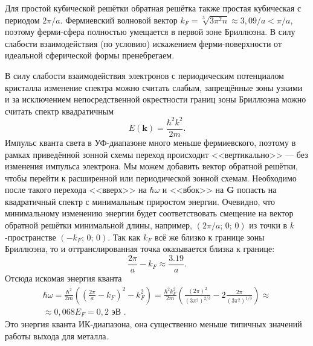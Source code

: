 \documentclass[a4paper]{article}
\begin{document}
\begin{sol}
Для простой кубической решётки обратная решётка
также простая кубическая с периодом $2\pi /a$.
Фермиевский волновой вектор $k_F = \sqrt[3]{3\pi^2 n} \approx 3,09 /a< \pi /a$, поэтому ферми-сфера
полностью умещается в первой зоне Бриллюэна.
В силу слабости взаимодействия (по условию)
искажением ферми-поверхности от идеальной
сферической формы пренебрегаем.

В силу слабости взаимодействия электронов с периодическим потенциалом кристалла изменение спектра можно
считать слабым, запрещённые зоны узкими и за
исключением непосредственной окрестности границ
зоны Бриллюэна можно считать спектр квадратичным
\[
	E(\mathbf{k})= \frac{\hbar ^2 k^2}{2m}
.\] 
Импульс кванта света в УФ-диапазоне много меньше
фермиевского, поэтому в рамках приведённой зонной
схемы переход происходит <<вертикально>> ---
без изменения импульса электрона. Мы можем добавить
вектор обратной решётки, чтобы перейти к расширенной
или периодической зонной схемам. Необходимо после
такого перехода <<вверх>> на $\hbar \omega$ и
<<вбок>> на $\mathbf{G}$ попасть на квадратичный
спектр с минимальным приростом энергии. Очевидно,
что минимальному изменению энергии будет
соответствовать смещение на вектор обратной
решётки минимальной длины, например, $\left( 2\pi /a;\, 0;\, 0 \right) $ из точки в $k$-пространстве
$\left( -k_F;\,0;\,0 \right) $. Так как $k_F$ 
всё же близко к границе зоны Бриллюэна, то и
оттранслированная точка оказывается близка к
границе:
\[
\frac{2\pi}{a} -k_F \approx \frac{3.19
}{a}
.\] 
Отсюда искомая энергия кванта
\begin{multline*}
	\hbar  \omega= \frac{\hbar ^2}{2m} \left( 
	\left( \frac{2\pi}{a}-k_F \right) ^2-
k_F^2\right) = \frac{\hbar ^2 k_F^2}{2m} \left( 
\frac{(2\pi)^2}{\left( 3\pi ^2 \right) ^{2 /3}}-
2 \frac{2\pi}{\left( 3\pi^2 \right) ^{1 /3}}\right) 
\approx \\
\approx 0,068 E_F= 0,2 \text{ эВ }
.\end{multline*} 
Это энергия кванта ИК-диапазона, она существенно
меньше типичных значений работы выхода для металла.
\end{sol}
\end{document}
